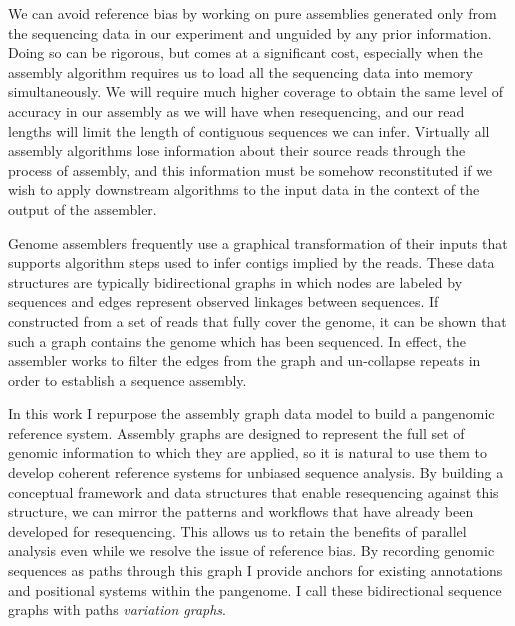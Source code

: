 We can avoid reference bias by working on pure assemblies generated only from the sequencing data in our experiment and unguided by any prior information.
Doing so can be rigorous, but comes at a significant cost, especially when the assembly algorithm requires us to load all the sequencing data into memory simultaneously.
We will require much higher coverage to obtain the same level of accuracy in our assembly as we will have when resequencing, and our read lengths will limit the length of contiguous sequences we can infer.
Virtually all assembly algorithms lose information about their source reads through the process of assembly, and this information must be somehow reconstituted if we wish to apply downstream algorithms to the input data in the context of the output of the assembler.

Genome assemblers frequently use a graphical transformation of their inputs that supports algorithm steps used to infer contigs implied by the reads.
These data structures are typically bidirectional graphs in which nodes are labeled by sequences and edges represent observed linkages between sequences.
If constructed from a set of reads that fully cover the genome, it can be shown that such a graph contains the genome which has been sequenced.
In effect, the assembler works to filter the edges from the graph and un-collapse repeats in order to establish a sequence assembly.

In this work I repurpose the assembly graph data model to build a pangenomic reference system.
Assembly graphs are designed to represent the full set of genomic information to which they are applied, so it is natural to use them to develop coherent reference systems for unbiased sequence analysis.
By building a conceptual framework and data structures that enable resequencing against this structure, we can mirror the patterns and workflows that have already been developed for resequencing.
This allows us to retain the benefits of parallel analysis even while we resolve the issue of reference bias.
By recording genomic sequences as paths through this graph I provide anchors for existing annotations and positional systems within the pangenome.
I call these bidirectional sequence graphs with paths \emph{variation graphs}.


